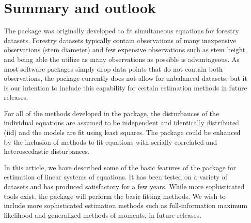 

\section{Summary and outlook}\label{sec:Summmary}

The  package was originally developed to fit
simultaneous equations for forestry datasets.
Forestry datasets typically contain observations of many inexpensive
observations (stem diameter) and few expensive observations such
as stem height and being able the utilize as many observations as
possible is advantageous.
As most software packages simply drop data points that do not contain
both observations, the  package currently does not
allow for unbalanced datasets, but it is our intention to include this
capability for certain estimation methods in future releases.

For all of the methods developed in the package, the disturbances of
the individual equations are assumed to be independent and identically
distributed (iid) and the models are fit using least squares.  
The package could be enhanced by the inclusion of methods to fit
equations with serially correlated and heteroscedastic disturbances.

In this article, we have described some of the basic features of the
 package for estimation of linear systems of
equations.
It has been tested on a variety of datasets and has produced satisfactory
for a few years.
While more sophisticated tools exist, the  package will
perform the basic fitting methods.
We wish to include more sophisticated estimation methods such
as full-information maximum likelihood and generalized methods of
moments, in future releases. 





